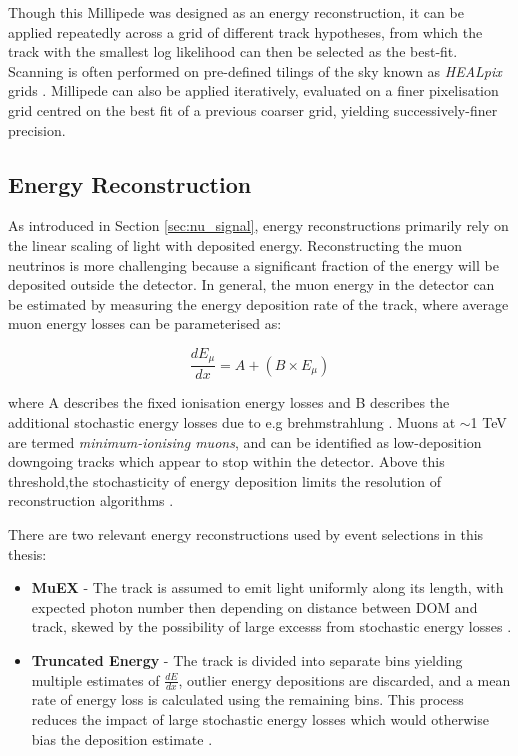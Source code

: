Though this Millipede was designed as an energy reconstruction, it can be applied repeatedly across a grid of different track hypotheses, from which the track with the smallest log likelihood can then be selected as the best-fit. Scanning is often performed on pre-defined tilings of the sky known as \emph{HEALpix} grids . Millipede can also be applied iteratively, evaluated on a finer pixelisation grid centred on the best fit of a previous coarser grid, yielding successively-finer precision. 
 
 \subsection*{Energy Reconstruction}
 
 As introduced in Section \ref{sec:nu_signal}, energy reconstructions primarily rely on the linear scaling of light with deposited energy. Reconstructing the muon neutrinos is more challenging because a significant fraction of the energy will be deposited outside the detector. In general, the muon energy in the detector can be estimated by measuring the energy deposition rate of the track, where average muon energy losses can be parameterised as:
 
 \begin{equation}
 	\frac{dE_{\mu}}{dx} = A + \left(B \times E_{\mu} \right)
 \end{equation}
 
 where A describes the fixed ionisation energy losses and B describes the additional stochastic energy losses due to e.g brehmstrahlung . Muons at $\sim$1 TeV are termed \emph{minimum-ionising muons}, and can be identified as low-deposition downgoing tracks which appear to stop within the detector. Above this threshold,the stochasticity of energy deposition limits the resolution of reconstruction algorithms \cite{ic_energy_reco_14}. 
 
There are two relevant energy reconstructions used by event selections in this thesis:
 
 \begin{itemize}
 	\item \textbf{MuEX} - The track is assumed to emit light uniformly along its length, with expected photon number then depending on distance between DOM and track, skewed by the possibility of large excesss from stochastic energy losses \cite{kintscher_thesis}. 
 	\item \textbf{Truncated Energy} - The track is divided into separate bins yielding multiple estimates of $\frac{dE}{dx}$, outlier energy depositions are discarded, and a mean rate of energy loss is calculated using the remaining bins. This process reduces the impact of large stochastic energy losses which would otherwise bias the deposition estimate \cite{ic_truncated_energy_13}.
 \end{itemize}
 
